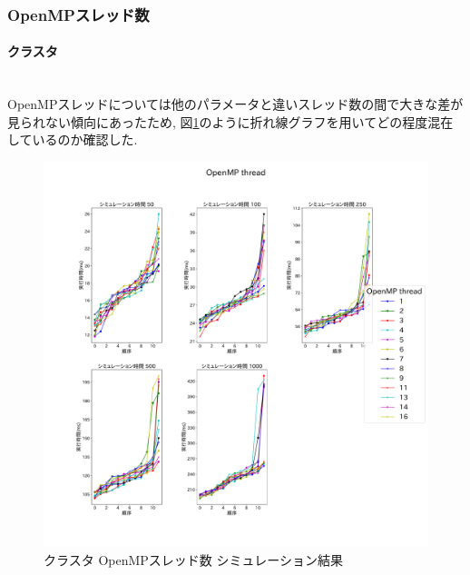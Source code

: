 \subsubsection{OpenMPスレッド数}
\paragraph{クラスタ}~\\
OpenMPスレッドについては他のパラメータと違いスレッド数の間で大きな差が見られない傾向にあったため,
図\ref{fig:cluster-openmp}のように折れ線グラフを用いてどの程度混在しているのか確認した.\\

\begin{figure}[htb]
\begin{center}
    \includegraphics[width=14cm]{./images/cluster-OpenMP-thread.pdf}
    \caption{クラスタ OpenMPスレッド数 シミュレーション結果}
    \label{fig:cluster-openmp}
\end{center}
\end{figure}

